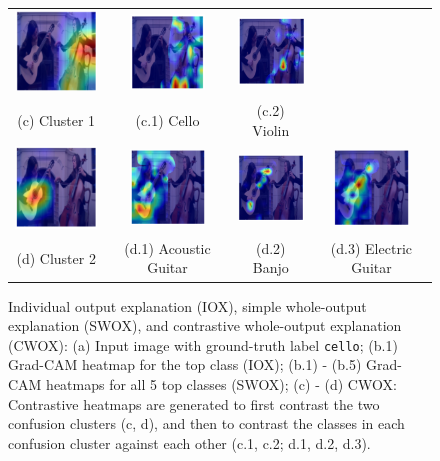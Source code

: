 \documentclass[12pt,a4paper]{article}
\begin{document}
\begin{figure}[t]
\begin{tabular}{cccc}
 \includegraphics[width=2.5cm]{Fig/fig2/inter1.png}&
\includegraphics[width=2cm]{Fig/fig2/intra1.png}&
\includegraphics[width=2cm]{Fig/fig2/intra2.png}&
   \\
 {\scriptsize  (c) Cluster 1  }   &  {\scriptsize  (c.1) Cello  }  &{\scriptsize  (c.2) Violin  } & \\
\includegraphics[width=2.5cm]{Fig/fig2/inter2.png}&
 \includegraphics[width=2cm]{Fig/fig2/intra3.png}&
\includegraphics[width=2cm]{Fig/fig2/intra4.png}&
\includegraphics[width=2cm]{Fig/fig2/intra5.png}
   \\
{\scriptsize (d) Cluster 2 } &  {\scriptsize  (d.1) Acoustic Guitar  }   &  {\scriptsize  (d.2) Banjo }  &{\scriptsize  (d.3) Electric Guitar }
\end{tabular}
\caption{\small Individual output explanation (IOX), simple whole-output explanation (SWOX), and contrastive whole-output explanation (CWOX):
(a) Input image with ground-truth label {\tt cello}; (b.1) Grad-CAM heatmap for the top class (IOX); (b.1) - (b.5) Grad-CAM heatmaps for all 5 top classes (SWOX);
(c) - (d) CWOX: Contrastive heatmaps are generated to first contrast the two  confusion clusters (c, d), and then to contrast the classes  in each confusion cluster against  each other (c.1, c.2; d.1, d.2, d.3).
 }
\label{cwox}
\end{figure}
\end{document}
